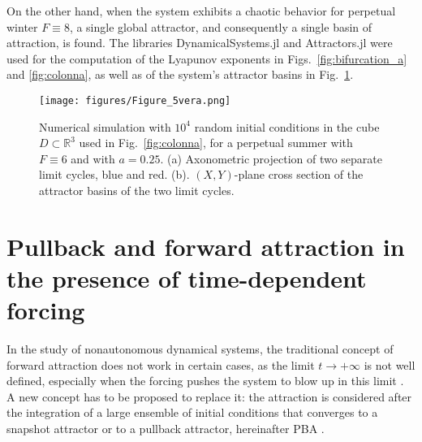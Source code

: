 \documentclass[%
 aip, cha,
 amsmath,amssymb,
 reprint,%
author-year,%
]{revtex4-1}
\newcommand{\0}{\mathbf 0}
\begin{document}
On the other hand, when the system exhibits a chaotic behavior for perpetual winter $F \equiv 8$, a single global attractor, and consequently a single basin of attraction, is found. The libraries DynamicalSystems.jl and Attractors.jl \citep{Datseris2018, Attractors.jl} were used for the computation of the Lyapunov exponents in Figs.~\ref{fig:bifurcation_a} and \ref{fig:colonna}, as well as of the system's attractor basins in Fig.~\ref{fig:basins}. \\
\begin{figure}[h]
\vspace{-25pt}
\hspace{-10pt}
    \texttt{[image: figures/Figure\_5vera.png]}
    \caption{Numerical simulation with $10^{4}$ random initial conditions in the cube $D \subset \mathbb R^3$ used in Fig.~\ref{fig:colonna}, for a perpetual summer with $F \equiv 6$ and with $a = 0.25$. 
    	(a) Axonometric projection of two separate limit cycles, blue and red. (b). $(X, Y)$-plane cross section of the attractor basins of the two limit cycles.}
    \label{fig:basins}
\vspace{-15pt}
\end{figure}


\section{Pullback and forward attraction in the presence of time-dependent forcing}
\label{sec:PBA}

In the study of nonautonomous dynamical systems, the traditional concept of forward attraction does not work in certain cases, as the limit $t \rightarrow + \infty$ is not well defined, especially when the forcing pushes the system to blow up in this limit \citep{Car.Han.2016, Kloeden.Yang.2020}. A new concept has to be proposed to replace it: the attraction is considered after the integration of a large ensemble of initial conditions that converges to a snapshot attractor \citep{Namenson.ea.1996, drotos} or to a pullback attractor,  hereinafter PBA \citep{Crauel.Flan.1994, ghil_PBA}. 
\end{document}
